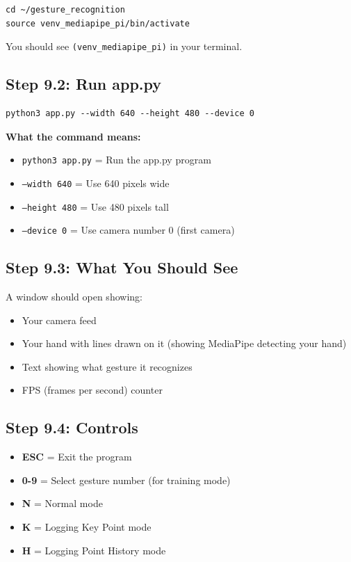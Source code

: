 \documentclass[12pt,a4paper]{article}
\begin{document}
\begin{lstlisting}
cd ~/gesture_recognition
source venv_mediapipe_pi/bin/activate
\end{lstlisting}

You should see \texttt{(venv\_mediapipe\_pi)} in your terminal.

\subsection{Step 9.2: Run app.py}

\begin{lstlisting}
python3 app.py --width 640 --height 480 --device 0
\end{lstlisting}

\begin{infobox}
\textbf{What the command means:}
\begin{itemize}
    \item \texttt{python3 app.py} = Run the app.py program
    \item \texttt{--width 640} = Use 640 pixels wide
    \item \texttt{--height 480} = Use 480 pixels tall
    \item \texttt{--device 0} = Use camera number 0 (first camera)
\end{itemize}
\end{infobox}

\subsection{Step 9.3: What You Should See}

A window should open showing:
\begin{itemize}
    \item Your camera feed
    \item Your hand with lines drawn on it (showing MediaPipe detecting your hand)
    \item Text showing what gesture it recognizes
    \item FPS (frames per second) counter
\end{itemize}

\subsection{Step 9.4: Controls}

\begin{itemize}
    \item \textbf{ESC} = Exit the program
    \item \textbf{0-9} = Select gesture number (for training mode)
    \item \textbf{N} = Normal mode
    \item \textbf{K} = Logging Key Point mode
    \item \textbf{H} = Logging Point History mode
\end{itemize}
\end{document}
